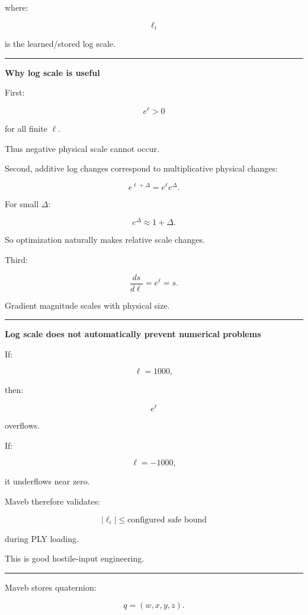 where:

\[
\ell_i
\]

is the learned/stored log scale.

\begin{center}\rule{0.5\linewidth}{0.5pt}\end{center}

\textbf{Why log scale is useful}

First:

\[
e^\ell>0
\]

for all finite \(\ell\).

Thus negative physical scale cannot occur.

Second, additive log changes correspond to multiplicative physical changes:

\[
e^{\ell+\Delta}
=
e^\ell e^\Delta.
\]

For small \(\Delta\):

\[
e^\Delta
\approx
1+\Delta.
\]

So optimization naturally makes relative scale changes.

Third:

\[
\frac{ds}{d\ell}
=
e^\ell
=
s.
\]

Gradient magnitude scales with physical size.

\begin{center}\rule{0.5\linewidth}{0.5pt}\end{center}

\textbf{Log scale does not automatically prevent numerical problems}

If:

\[
\ell=1000,
\]

then:

\[
e^\ell
\]

overflows.

If:

\[
\ell=-1000,
\]

it underflows near zero.

Maveb therefore validates:

\[
|\ell_i|
\le
\text{configured safe bound}
\]

during PLY loading.

This is good hostile-input engineering.

\begin{center}\rule{0.5\linewidth}{0.5pt}\end{center}

Maveb stores quaternion:

\[
q=(w,x,y,z).
\]

